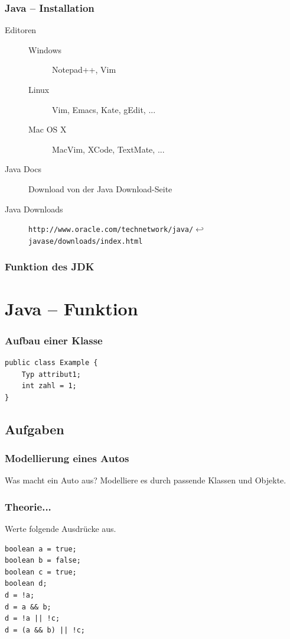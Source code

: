 \documentclass{beamer}
\begin{document}
\begin{frame}[fragile]
\frametitle{Java -- Installation}
\begin{description}
\item[Editoren]
\begin{description}
\item[Windows] Notepad++, Vim
\item[Linux] Vim, Emacs, Kate, gEdit, ...
\item[Mac OS X] MacVim, XCode, TextMate, ...
\end{description}
\item[Java Docs] Download von der Java Download-Seite
\item[Java Downloads] \verb|http://www.oracle.com/technetwork/java/|$\hookleftarrow$\\
\verb|javase/downloads/index.html|
\end{description}
\end{frame}

\begin{frame}
\frametitle{Funktion des JDK}
\end{frame}

\section{Java -- Funktion}
\begin{frame}[fragile]
\frametitle{Aufbau einer Klasse}
\begin{verbatim}
public class Example {
    Typ attribut1;
    int zahl = 1;
}
\end{verbatim}
\end{frame}

\subsection{Aufgaben}
\begin{frame}
\frametitle{Modellierung eines Autos}
Was macht ein Auto aus? Modelliere es durch passende Klassen und Objekte.
\end{frame}

\begin{frame}[fragile]
\frametitle{Theorie...}
Werte folgende Ausdr\"{u}cke aus.
\begin{verbatim}
boolean a = true;
boolean b = false;
boolean c = true;
boolean d;
d = !a;
d = a && b;
d = !a || !c;
d = (a && b) || !c;
\end{verbatim}
\end{frame}
\end{document}
